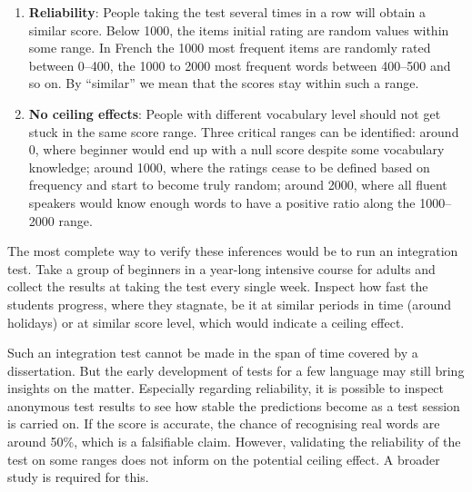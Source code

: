 \begin{enumerate}
  \item \textbf{Reliability}: People taking the test several times in a row will obtain a similar score. Below 1000, the items initial rating are random values within some range. In French the 1000 most frequent items are randomly rated between 0–400, the 1000 to 2000 most frequent words between 400–500 and so on. By ``similar'' we mean that the scores stay within such a range.
  \item \textbf{No ceiling effects}: People with different vocabulary level should not get stuck in the same score range. Three critical ranges can be identified: around 0, where beginner would end up with a null score despite some vocabulary knowledge; around 1000, where the ratings cease to be defined based on frequency and start to become truly random; around 2000, where all fluent speakers would know enough words to have a positive ratio along the 1000–2000 range.
\end{enumerate}

The most complete way to verify these inferences would be to run an integration test. Take a group of beginners in a year-long intensive course for adults and collect the results at taking the test every single week. Inspect how fast the students progress, where they stagnate, be it at similar periods in time (around holidays) or at similar score level, which would indicate a ceiling effect.

Such an integration test cannot be made in the span of time covered by a dissertation. But the early development of tests for a few language may still bring insights on the matter. Especially regarding reliability, it is possible to inspect anonymous test results to see how stable the predictions become as a test session is carried on. If the score is accurate, the chance of recognising real words are around 50\%, which is a falsifiable claim. However, validating the reliability of the test on some ranges does not inform on the potential ceiling effect. A broader study is required for this.


